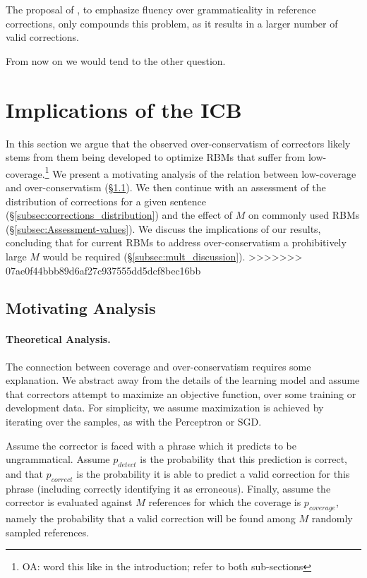 \documentclass[a4paper, 11pt]{article}
\newcommand{\oa}[1]{\footnote{\color{red}OA: #1}}
\begin{document}
The proposal of , to emphasize fluency over grammaticality in reference corrections, only compounds this problem, as it results in a larger number of valid corrections.

From now on we would tend to the other question.

\vspace{-.1cm}
\section{Implications of the ICB}\label{sec:formal_conservatism}
\vspace{-.1cm}

In this section we argue that the observed over-conservatism of correctors likely stems from them being developed to optimize RBMs that suffer from low-coverage.\oa{word this like in the introduction; refer to both sub-sections}
We present a motivating analysis of the relation between low-coverage and over-conservatism (\S \ref{subsec:motivating_analysis}). We then continue with an assessment of the distribution of corrections for a given sentence (\S \ref{subsec:corrections_distribution})
and the effect of $M$ on commonly used RBMs (\S \ref{subsec:Assessment-values}).
We discuss the implications of our results, concluding that for current RBMs  
to address over-conservatism a prohibitively large $M$ would be required (\S \ref{subsec:mult_discussion}).
>>>>>>> 07ae0f44bbb89d6af27c937555dd5dcf8bec16bb


\subsection{Motivating Analysis}\label{subsec:motivating_analysis}
%

\paragraph{Theoretical Analysis.}
The connection between coverage and over-conservatism requires some explanation.
We abstract away from the details of the learning model and assume that correctors attempt to maximize an objective function, 
over some training or development data. For simplicity, we assume maximization is achieved by iterating over the samples, as with the Perceptron or SGD.

Assume the corrector is faced with a phrase which it predicts to be ungrammatical. 
Assume $p_{detect}$ is the probability that this prediction is correct, and that
$p_{correct}$ is the probability it is able to predict
a valid correction for this phrase (including correctly identifying it as erroneous).
Finally, assume the corrector is evaluated
against $M$ references for which the coverage is $p_{coverage}$,
namely the probability that
a valid correction will be found among $M$ randomly sampled references.
\end{document}
